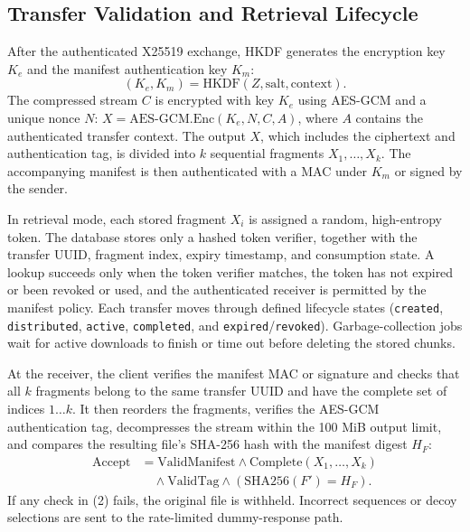 \documentclass[conference]{IEEEtran}
\begin{document}
\subsection{Transfer Validation and Retrieval Lifecycle}
After the authenticated X25519 exchange, HKDF generates the encryption key $K_e$ and the manifest authentication key $K_m$:
\begin{equation}
(K_e, K_m) = \mathrm{HKDF}(Z, \mathrm{salt}, \mathrm{context}).
\end{equation}
The compressed stream $C$ is encrypted with key $K_e$ using AES-GCM and a unique nonce $N$: $X = \mathrm{AES\text{-}GCM.Enc}(K_e, N, C, A)$, where $A$ contains the authenticated transfer context. The output $X$, which includes the ciphertext and authentication tag, is divided into $k$ sequential fragments $X_1, \dots, X_k$. The accompanying manifest is then authenticated with a MAC under $K_m$ or signed by the sender.

In retrieval mode, each stored fragment $X_i$ is assigned a random, high-entropy token. The database stores only a hashed token verifier, together with the transfer UUID, fragment index, expiry timestamp, and consumption state. A lookup succeeds only when the token verifier matches, the token has not expired or been revoked or used, and the authenticated receiver is permitted by the manifest policy. Each transfer moves through defined lifecycle states (\texttt{created}, \texttt{distributed}, \texttt{active}, \texttt{completed}, and \texttt{expired}/\texttt{revoked}). Garbage-collection jobs wait for active downloads to finish or time out before deleting the stored chunks.

At the receiver, the client verifies the manifest MAC or signature and checks that all $k$ fragments belong to the same transfer UUID and have the complete set of indices $1 \dots k$. It then reorders the fragments, verifies the AES-GCM authentication tag, decompresses the stream within the 100 MiB output limit, and compares the resulting file's SHA-256 hash with the manifest digest $H_F$:
\begin{equation}
\begin{split}
\mathrm{Accept} &= \mathrm{ValidManifest} \land \mathrm{Complete}(X_1, \dots, X_k) \\
&\quad \land \mathrm{ValidTag} \land (\mathrm{SHA256}(F') = H_F).
\end{split}
\end{equation}
If any check in (2) fails, the original file is withheld. Incorrect sequences or decoy selections are sent to the rate-limited dummy-response path.
\end{document}
